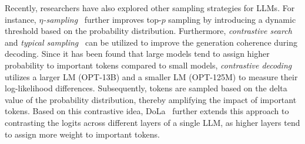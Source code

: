 Recently, researchers have also explored other sampling strategies for LLMs. For instance, \emph{$\eta$-sampling}~\cite{Hewitt-emnlp-2022-Truncation} further improves top-$p$ sampling by introducing a dynamic threshold based on the probability distribution. Furthermore, \emph{contrastive search}~\cite{Su-2022-NIPS-A} and \emph{typical sampling}~\cite{Meister-TACL-2023-Locally} can be utilized to improve the generation coherence during decoding. 
{Since it has been found that large models tend to assign higher probability to important tokens compared to small models, \emph{contrastive decoding}~\cite{Li-ACL-2023-Contrastive} utilizes a larger LM (\eg OPT-13B) and a smaller LM (\eg OPT-125M) to measure their log-likelihood differences. Subsequently, tokens are sampled based on the delta value of the probability distribution, thereby amplifying the impact of important tokens.} 
{Based on this contrastive idea, DoLa~\cite{Chuang-arxiv-2023-DoLa} further extends this approach to contrasting the logits across different layers of a single LLM, as higher layers tend to assign more weight to important tokens.}









